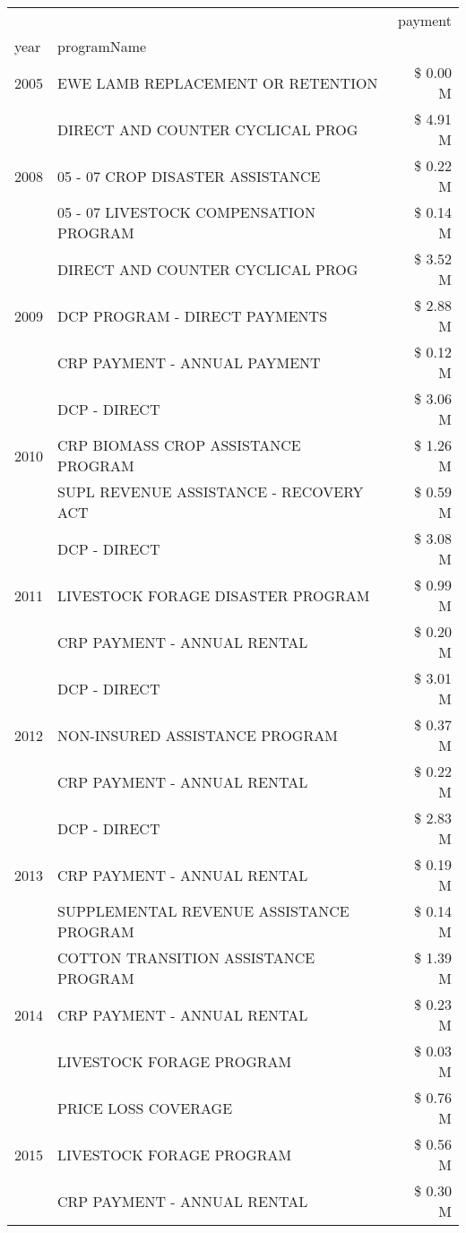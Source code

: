 \begin{tabular}{llr}
\toprule
 &  & payment \\
year & programName &  \\
\midrule
2005 & EWE LAMB REPLACEMENT OR RETENTION & \$ 0.00 M \\
\cline{1-3}
\multirow[t]{3}{*}{2008} & DIRECT AND COUNTER CYCLICAL PROG & \$ 4.91 M \\
 & 05 - 07 CROP DISASTER ASSISTANCE & \$ 0.22 M \\
 & 05 - 07 LIVESTOCK COMPENSATION PROGRAM & \$ 0.14 M \\
\cline{1-3}
\multirow[t]{3}{*}{2009} & DIRECT AND COUNTER CYCLICAL PROG & \$ 3.52 M \\
 & DCP PROGRAM - DIRECT PAYMENTS & \$ 2.88 M \\
 & CRP PAYMENT - ANNUAL PAYMENT & \$ 0.12 M \\
\cline{1-3}
\multirow[t]{3}{*}{2010} & DCP - DIRECT & \$ 3.06 M \\
 & CRP BIOMASS CROP ASSISTANCE PROGRAM & \$ 1.26 M \\
 & SUPL REVENUE ASSISTANCE - RECOVERY ACT & \$ 0.59 M \\
\cline{1-3}
\multirow[t]{3}{*}{2011} & DCP - DIRECT & \$ 3.08 M \\
 & LIVESTOCK FORAGE DISASTER PROGRAM & \$ 0.99 M \\
 & CRP PAYMENT - ANNUAL RENTAL & \$ 0.20 M \\
\cline{1-3}
\multirow[t]{3}{*}{2012} & DCP - DIRECT & \$ 3.01 M \\
 & NON-INSURED ASSISTANCE PROGRAM & \$ 0.37 M \\
 & CRP PAYMENT - ANNUAL RENTAL & \$ 0.22 M \\
\cline{1-3}
\multirow[t]{3}{*}{2013} & DCP - DIRECT & \$ 2.83 M \\
 & CRP PAYMENT - ANNUAL RENTAL & \$ 0.19 M \\
 & SUPPLEMENTAL REVENUE ASSISTANCE PROGRAM & \$ 0.14 M \\
\cline{1-3}
\multirow[t]{3}{*}{2014} & COTTON TRANSITION ASSISTANCE PROGRAM & \$ 1.39 M \\
 & CRP PAYMENT - ANNUAL RENTAL & \$ 0.23 M \\
 & LIVESTOCK FORAGE PROGRAM & \$ 0.03 M \\
\cline{1-3}
\multirow[t]{3}{*}{2015} & PRICE LOSS COVERAGE & \$ 0.76 M \\
 & LIVESTOCK FORAGE PROGRAM & \$ 0.56 M \\
 & CRP PAYMENT - ANNUAL RENTAL & \$ 0.30 M \\

\end{tabular}
